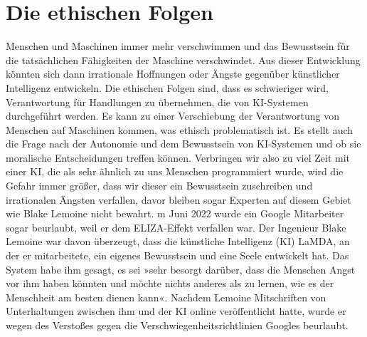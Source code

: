 \documentclass{article}
\begin{document}
    \section{Die ethischen Folgen}
    Menschen und Maschinen immer mehr verschwimmen und das Bewusstsein für die tatsächlichen Fähigkeiten der Maschine verschwindet. Aus dieser Entwicklung könnten sich dann irrationale Hoffnungen oder Ängste gegenüber künstlicher Intelligenz entwickeln. Die ethischen Folgen sind, dass es schwieriger wird, Verantwortung für Handlungen zu übernehmen, die von KI-Systemen durchgeführt werden. Es kann zu einer Verschiebung der Verantwortung von Menschen auf Maschinen kommen, was ethisch problematisch ist. Es stellt auch die Frage nach der Autonomie und dem Bewusstsein von KI-Systemen und ob sie moralische Entscheidungen treffen können.
    Verbringen wir also zu viel Zeit mit einer KI, die als sehr ähnlich zu uns Menschen programmiert wurde, wird die Gefahr immer größer, dass wir dieser ein Bewusstsein zuschreiben und irrationalen Ängsten verfallen, davor bleiben sogar Experten auf diesem Gebiet wie Blake Lemoine nicht bewahrt. m Juni 2022 wurde ein Google Mitarbeiter sogar beurlaubt, weil er dem ELIZA-Effekt verfallen war. Der Ingenieur Blake Lemoine war davon überzeugt, dass die künstliche Intelligenz (KI) LaMDA, an der er mitarbeitete, ein eigenes Bewusstsein und eine Seele entwickelt hat. Das System habe ihm gesagt, es sei »sehr besorgt darüber, dass die Menschen Angst vor ihm haben könnten und möchte nichts anderes als zu lernen, wie es der Menschheit am besten dienen kann«. Nachdem Lemoine Mitschriften von Unterhaltungen zwischen ihm und der KI online veröffentlicht hatte, wurde er wegen des Verstoßes gegen die Verschwiegenheitsrichtlinien Googles beurlaubt.

\printbibliography
\end{document}
